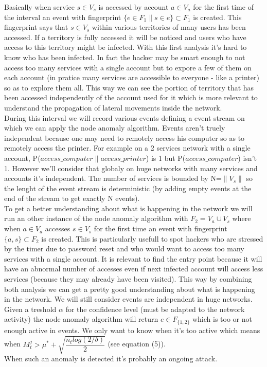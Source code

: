 \documentclass[11pt]{article}
\begin{document}
Basically when service $s\in V_s$ is accessed by account $a\in V_a$ for the first time of the interval an event with fingerprint $\{e\in F_1 \| s \in e\}\subset F_1$ is created. This fingerprint says that $s\in V_s$ within various territories of many users has been accessed. If a territory is fully accessed it will be noticed and users who have access to this territory might be infected. With this first analysis it's hard to know who has been infected. In fact the hacker may be smart enough to not access too many services with a single account but to expore a few of them on each account (in pratice many services are accessible to everyone - like a printer) so as to explore them all. This way we can see the portion of territory that has been accessed independently of the account used for it which is more relevant to understand the propagation of lateral movements inside the network.\\
\indent During this interval we will record various events defining a event stream on which we can apply the node anomaly algorithm. Events aren't truely independent because one may need to remotely access his computer so as to remotely access the printer. For example on a 2 services network with a single account, P($access\_computer\|access\_printer$) is 1 but P($access\_computer$) isn't 1. However we'll consider that globaly on huge networks with many services and accounts it's independent. The number of services is bounded by N=$\|V_s\|$ so the lenght of the event stream is deterministic (by adding empty events at the end of the stream to get exactly N events).\\
\indent To get a better understanding about what is happening in the network we will run an other instance of the node anomaly algorithm with $F_2 = V_a \cup V_s$ where when $a\in V_a$ accesses $s\in V_s$ for the first time an event with fingerprint $\{a,s\} \subset F_2$ is created. This is particularly usefull to spot hackers who are stressed by the timer due to password reset and who would want to access too many services with a single account. It is relevant to find the entry point because it will have an abnormal number of accesses even if next infected account will access less services (because they may already have been visited). This way by combining both analysis we can get a pretty good understanding about what is happening in the network. We will still consider events are independent in huge networks.\\
\indent Given a treshold $\alpha$ for the confidence level (must be adapted to the network activity) the node anomaly algorithm will return $e\in F_{\{1,2\}}$ which is too or not enough active in events. We only want to know when it's too active which means when $M_t^{j} > \mu^*+\sqrt{\dfrac{n_tlog(2/\delta)}{2}}$ (see \cite{node} equation (5)). \\
\indent When such an anomaly is detected it's probably an ongoing attack. 
\end{document}
